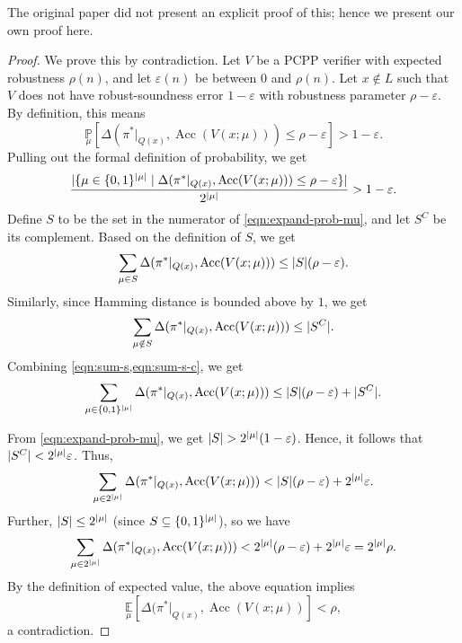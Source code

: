 \documentclass[english,12pt]{reedthesis}
\theoremstyle{plain}
\theoremstyle{definition}
\theoremstyle{remark}
\DeclareMathOperator{\Acc}{Acc}
\DeclarePairedDelimiter{\abs}{\lvert}{\rvert}
\begin{document}
The original paper did not present an explicit proof of this; hence we present
our own proof here.

\begin{proof}
  We prove this by contradiction. Let $V$ be a PCPP verifier with expected
  robustness $\rho(n)$, and let $\varepsilon(n)$ be between $0$ and $\rho(n)$. Let $x \notin L$ such
  that $V$ does not have robust-soundness error $1 - \varepsilon$ with robustness
  parameter $\rho - \varepsilon$. By definition, this means
  \begin{equation}
    \underset{\mu}{\mathbb{P}}[\Delta(\pi^{*}|_{Q(x)}, \Acc(V(x; \mu))) \le \rho - \varepsilon] > 1 - \varepsilon.
  \end{equation}
  Pulling out the formal definition of probability, we get
  \begin{equation}\label{eqn:expand-prob-mu}
    \frac{\abs{\{\mu \in \{0, 1\}^{\abs{\mu}} \mid \Delta(\pi^{*}|_{Q(x)}, \Acc(V(x; \mu))) \le \rho - \varepsilon\}}}{2^{\abs{\mu}}} > 1 - \varepsilon.
  \end{equation}
  Define $S$ to be the set in the numerator of \cref{eqn:expand-prob-mu}, and
  let $S^{C}$ be its complement. Based on the definition of $S$, we get
  \begin{equation}\label{eqn:sum-s}
    \sum_{\mu \in S}\Delta(\pi^{*}|_{Q(x)}, \Acc(V(x; \mu))) \le \abs{S}(\rho - \varepsilon).
  \end{equation}
  Similarly, since Hamming distance is bounded above by $1$, we get
  \begin{equation}\label{eqn:sum-s-c}
    \sum_{\mu \notin S}\Delta(\pi^{*}|_{Q(x)}, \Acc(V(x; \mu))) \le \abs{S^{C}}.
  \end{equation}
  Combining \cref{eqn:sum-s,eqn:sum-s-c}, we get
  \begin{equation}
    \sum_{\mu \in \{0, 1\}^{\abs{\mu}}}\Delta(\pi^{*}|_{Q(x)}, \Acc(V(x; \mu))) \le \abs{S}(\rho - \varepsilon) + \abs{S^{C}}.
  \end{equation}

  From \cref{eqn:expand-prob-mu}, we get $\abs{S} > 2^{\abs{\mu}}(1 - \varepsilon)$. Hence,
  it follows that $\abs{S^{C}} < 2^{\abs{\mu}}\varepsilon$. Thus,
  \begin{equation}
    \sum_{\mu \in 2^{\abs{\mu}}}\Delta(\pi^{*}|_{Q(x)}, \Acc(V(x; \mu))) < \abs{S}(\rho - \varepsilon) + 2^{\abs{\mu}}\varepsilon.
  \end{equation}
  Further, $\abs{S} \le 2^{\abs{\mu}}$ (since $S \subseteq \{0, 1\}^{\abs{\mu}}$), so we have
  \begin{equation}
    \sum_{\mu \in 2^{\abs{\mu}}}\Delta(\pi^{*}|_{Q(x)}, \Acc(V(x; \mu))) < 2^{\abs{\mu}}(\rho - \varepsilon) + 2^{\abs{\mu}}\varepsilon = 2^{\abs{\mu}}\rho.
  \end{equation}
  By the definition of expected value, the above equation implies
  \begin{equation}
    \underset{\mu}{\mathbb{E}}[\Delta(\pi^{*}|_{Q(x)}, \Acc(V(x; \mu))] < \rho,
  \end{equation}
  a contradiction.
\end{proof}
\end{document}
